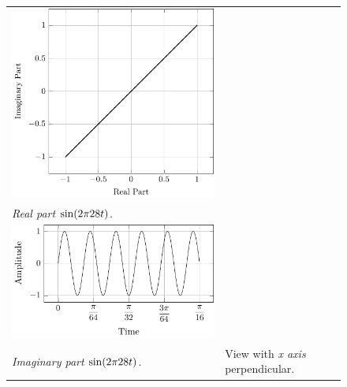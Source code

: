 \documentclass[../../course]{subfiles}
\begin{document}
\begin{figure} [H]
\begin{NiceTabularX} {\textwidth} {
            *{2}{>{\centering\arraybackslash}X}
        }
         {
             {
                \includegraphics[height = \textheight] {tikzpics/plotFrontViewComplexA.pdf}
            }
        }

        \\

         {\emph{Real part} $\sin(2 \pi 28 t)$.}
        \label{plt:realCmplxA}

        &
        \\

         {
             {
                \includegraphics[height = \textheight] {tikzpics/plotShortX1.pdf}
            }
        }

        &
        \\

         {\emph{Imaginary part} $\sin(2 \pi 28 t)$.}
        \label{plt:imagCmplxA}

        &

         {View with \emph{x axis} perpendicular.}
        \label{plt:frontViewCmplxA}

        \\

    \end{NiceTabularX}

\end{figure}
\end{document}
